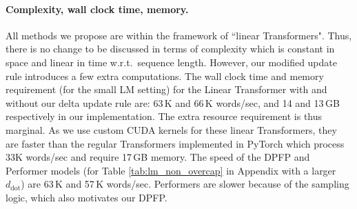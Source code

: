 \documentclass{article}
\theoremstyle{definition}
\begin{document}
\begin{table}[t]

\end{table}

\paragraph{Complexity, wall clock time, memory.}
All methods we propose are within the framework of ``linear Transformers".
Thus, there is no change to be discussed in terms of complexity
which is constant in space and linear in time w.r.t.~sequence length.
However, our modified update rule introduces a few extra computations.
The wall clock time and memory requirement (for the small LM setting)
for the Linear Transformer with and without our delta
update rule are: 63\,K and 66\,K words/sec, and 14 and 13\,GB respectively in our implementation.
The extra resource requirement is thus marginal.
As we use custom CUDA kernels for these linear Transformers,
they are faster than the regular Transformers implemented in PyTorch which process 33K words/sec and require 17\,GB memory.
The speed of the DPFP and Performer models (for Table \ref{tab:lm_non_overcap} in Appendix with a larger $d_\text{dot}$) are 63\,K and 57\,K words/sec.
Performers are slower because of the sampling logic,
which also motivates our DPFP.
\end{document}
